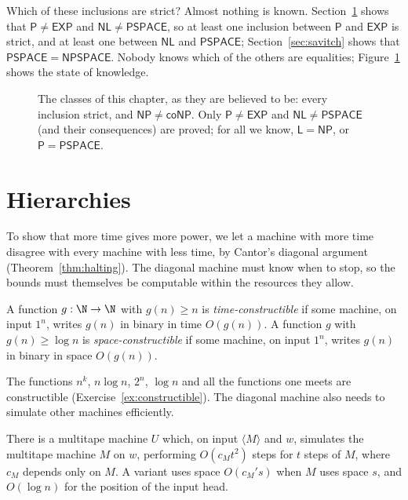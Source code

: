 Which of these inclusions are strict? Almost nothing is known. Section~\ref{sec:hierarchies} shows that $\mathsf P\ne\mathsf{EXP}$ and $\mathsf{NL}\ne\mathsf{PSPACE}$, so at least one inclusion between $\mathsf P$ and $\mathsf{EXP}$ is strict, and at least one between $\mathsf{NL}$ and $\mathsf{PSPACE}$; Section~\ref{sec:savitch} shows that $\mathsf{PSPACE}=\mathsf{NPSPACE}$. Nobody knows which of the others are equalities; Figure~\ref{fig:classes} shows the state of knowledge.

\begin{figure}[ht]
\centering
{}
\caption{The classes of this chapter, as they are believed to be: every inclusion strict, and $\mathsf{NP}\ne\mathsf{coNP}$. Only $\mathsf P\ne\mathsf{EXP}$ and $\mathsf{NL}\ne\mathsf{PSPACE}$ (and their consequences) are proved; for all we know, $\mathsf L=\mathsf{NP}$, or $\mathsf P=\mathsf{PSPACE}$.}
\label{fig:classes}
\end{figure}

\section{Hierarchies}\label{sec:hierarchies}

To show that more time gives more power, we let a machine with more time disagree with every machine with less time, by Cantor's diagonal argument (Theorem~\ref{thm:halting}). The diagonal machine must know when to stop, so the bounds must themselves be computable within the resources they allow.

\begin{definition}\label{def:constructible}
A function $g:\N\to\N$ with $g(n)\ge n$ is \emph{time-constructible} if some machine, on input $1^n$, writes $g(n)$ in binary in time $O(g(n))$. A function $g$ with $g(n)\ge\log n$ is \emph{space-constructible} if some machine, on input $1^n$, writes $g(n)$ in binary in space $O(g(n))$.
\end{definition}

The functions $n^k$, $n\log n$, $2^n$, $\log n$ and all the functions one meets are constructible (Exercise~\ref{ex:constructible}). The diagonal machine also needs to simulate other machines efficiently.

\begin{lemma}\label{lem:efficientuniversal}
There is a multitape machine $U$ which, on input $\langle M\rangle$ and $w$, simulates the multitape machine $M$ on $w$, performing $O(c_Mt^2)$ steps for $t$ steps of $M$, where $c_M$ depends only on $M$. A variant uses space $O(c_M's)$ when $M$ uses space $s$, and $O(\log n)$ for the position of the input head.
\end{lemma}

